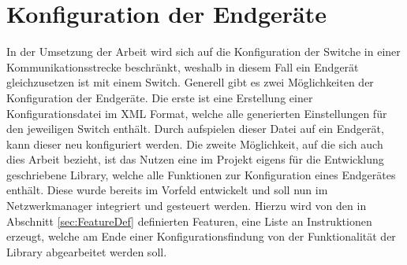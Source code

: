 \section{Konfiguration der Endgeräte}\label{sec:ConfigEndgerät}
In der Umsetzung der Arbeit wird sich auf die Konfiguration der Switche in einer Kommunikationsstrecke beschränkt, weshalb in diesem Fall ein Endgerät gleichzusetzen ist mit einem Switch. Generell gibt es zwei Möglichkeiten der Konfiguration der Endgeräte. Die erste ist eine Erstellung einer Konfigurationsdatei im \ac{XML} Format, welche alle generierten Einstellungen für den jeweiligen Switch enthält. Durch aufspielen dieser Datei auf ein Endgerät, kann dieser neu konfiguriert werden. Die zweite Möglichkeit, auf die sich auch dies Arbeit bezieht, ist das Nutzen eine im Projekt eigens für die Entwicklung geschriebene Library, welche alle Funktionen zur Konfiguration eines Endgerätes enthält. Diese wurde bereits im Vorfeld entwickelt und soll nun im Netzwerkmanager integriert und gesteuert werden. Hierzu wird von den in Abschnitt \ref{sec:FeatureDef} definierten Featuren, eine Liste an Instruktionen erzeugt, welche am Ende einer Konfigurationsfindung von der Funktionalität der Library abgearbeitet werden soll.
